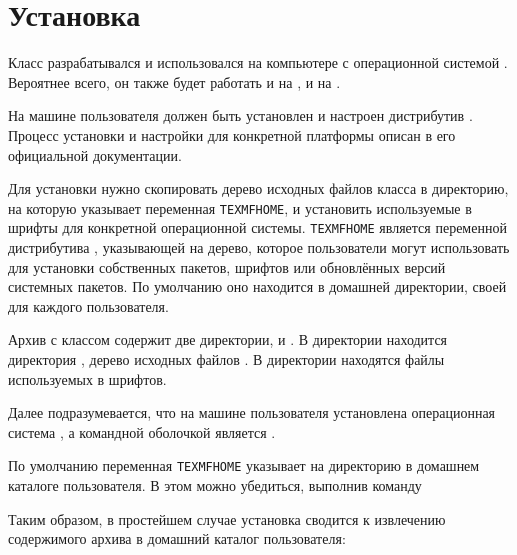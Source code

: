 
\section{Установка}

Класс  разрабатывался и использовался на компьютере с операционной
системой . Вероятнее всего, он также будет работать и на
, и на .

На машине пользователя  должен быть установлен и настроен
дистрибутив . Процесс установки и настройки 
для конкретной платформы описан в его официальной документации.

Для установки  нужно скопировать дерево исходных файлов класса в
директорию, на которую указывает переменная \texttt{TEXMFHOME}, и установить
используемые в  шрифты для конкретной операционной системы.
\texttt{TEXMFHOME} является переменной дистрибутива ,
указывающей на дерево, которое пользователи  могут использовать
для установки собственных пакетов, шрифтов или обновлённых версий системных
пакетов. По умолчанию оно находится в домашней директории, своей для каждого
пользователя.

Архив с классом  содержит две директории,  и
. В директории  находится директория , дерево
исходных файлов . В директории  находятся файлы
используемых в  шрифтов.

Далее подразумевается, что на машине пользователя установлена операционная
система , а командной оболочкой является .

По умолчанию переменная \texttt{TEXMFHOME} указывает на директорию  в
домашнем каталоге пользователя. В этом можно убедиться, выполнив команду


Таким образом, в простейшем случае установка  сводится к извлечению
содержимого архива в домашний каталог пользователя:

